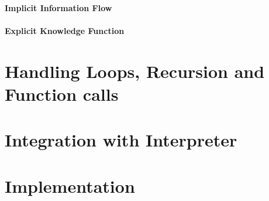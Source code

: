 \paragraph{Implicit Information Flow}


\paragraph{Explicit Knowledge Function}


\section{Handling Loops, Recursion and Function calls}

\section{Integration with Interpreter}

\section{Implementation}